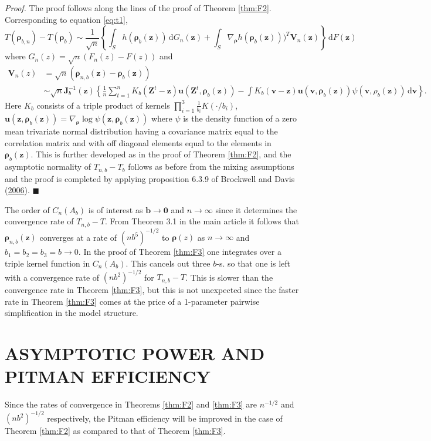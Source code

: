 \documentclass[
  12pt,
  letterpaper]{article}
\numberwithin{equation}{section}
\newcommand{\Z}{\bm{Z}}
\newcommand{\z}{\bm{z}}
\newcommand{\fv}{\bm{v}}
\newcommand{\fu}{\bm{u}}
\newcommand{\fV}{\bm{V}}
\newcommand{\J}{\bm{J}}
\newcommand{\frho}{\bm{\rho}}
\newcommand{\bb}{\bm{b}}
\newcommand{\di}{\,\textrm{d}}
\begin{document}
\emph{Proof.} The proof follows along the lines of the proof of Theorem \ref{thm:F2}. Corresponding to equation \eqref{eq:t1},
\[
T(\frho_{b,n}) - T(\frho_{b}) \sim \frac{1}{\sqrt{n}}\left\{\int_S h(\frho_b(\z)) \di G_n(\z) + \int_S \nabla_{\frho} h(\frho_b(\z)))^T \fV_n(\z)\right\} \di F(\z)
\]
where \(G_n(z) = \sqrt{n}(F_n(z)-F(z))\) and
\begin{align*}
\fV_n(z) &= \sqrt{n} (\frho_{n,b}(\z) - \frho_b(\z)) \\
& \sim \sqrt{n}{\J}_b^{-1}(\z)\left\{\frac{1}{n} \sum_{t=1}^{n}K_b(\Z^t-\z)\fu(\Z^t,\frho_b(\z)) - \int K_b(\fv-\z)\fu(\fv,\frho_b(\z))\psi(\fv,\rho_b(\z)) \di \fv \right\}.
\end{align*}
Here \(K_b\) consists of a triple product of kernels \(\prod_{i=1}^{3}\frac{1}{b_i}K(\cdot/b_i)\), \(\fu(\z,\frho_b(\z)) = \nabla_{\frho}\log \psi(\z,\frho_b(\z))\) where \(\psi\) is the density function of a zero mean trivariate normal distribution having a covariance matrix equal to the correlation matrix and with off diagonal elements equal to the elements in \(\frho_b(\z)\). This is further developed as in the proof of Theorem \ref{thm:F2}, and the asymptotic normality of \(T_{n,b}-T_b\) follows as before from the mixing assumptions and the proof is completed by applying proposition 6.3.9 of Brockwell and Davis (\protect\hyperlink{ref-brockwell1991time}{2006}). \(\blacksquare\)

The order of \(C_n(A_b)\) is of interest as \(\bb\to \bm{0}\) and \(n \to \infty\) since it determines the convergence rate of \(T_{n,b}-T\). From Theorem 3.1 in the main article it follows that \(\frho_{n,b}(\z)\) converges at a rate of \((nb^5)^{-1/2}\) to \(\frho(z)\) as \(n \to \infty\) and \(b_1=b_2=b_3 = b \to 0\). In the proof of Theorem \ref{thm:F3} one integrates over a triple kernel function in \(C_n(A_b)\). This cancels out three \(b\)-s. so that one is left with a convergence rate of \((nb^2)^{-1/2}\) for \(T_{n,b}-T\). This is slower than the convergence rate in Theorem \ref{thm:F3}, but this is not unexpected since the faster rate in Theorem \ref{thm:F3} comes at the price of a 1-parameter pairwise simplification in the model structure.

\hypertarget{chap:pitman}{%
\section{ASYMPTOTIC POWER AND PITMAN EFFICIENCY}\label{chap:pitman}}

Since the rates of convergence in Theorems \ref{thm:F2} and \ref{thm:F3} are \(n^{-1/2}\) and \((nb^2)^{-1/2}\) respectively, the Pitman efficiency will be improved in the case of Theorem \ref{thm:F2} as compared to that of Theorem \ref{thm:F3}.
\end{document}

